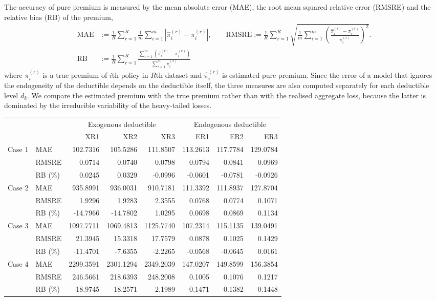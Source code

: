 \documentclass[11pt]{article}
\begin{document}
{The accuracy of pure premium is measured by the mean absolute error (MAE), the root mean squared relative error (RMSRE) and the relative bias (RB) of the premium,
\begin{align*}
\text{MAE}&:=\frac{1}{R}\sum_{r=1}^{R}\frac{1}{m}\sum_{i=1}^{m}\left|\hat\pi^{(r)}_i-\pi^{(r)}_i\right|,\qquad
\text{RMSRE}:=\frac{1}{R}\sum_{r=1}^{R}\sqrt{\frac{1}{m}\sum_{i=1}^{m}\left(\frac{\hat\pi^{(r)}_i-\pi^{(r)}_i}{\pi^{(r)}_i}\right)^2}.\\
\text{RB}&:=\frac{1}{R}\sum_{r=1}^{R}\frac{\sum_{i=1}^{m}(\hat\pi^{(r)}_i-\pi^{(r)}_i)}{\sum_{i=1}^{m}\pi_i^{(r)}}
\end{align*}
where $\pi^{(r)}_i$ is a true premium of $i$th policy in $R$th dataset and $\hat{\pi}^{(r)}_i$ is estimated pure premium. Since the error of a model that ignores the endogeneity of the deductible depends on the deductible itself, the three measures are also computed separately for each deductible level $d_k$. We compare the estimated premium with the true premium rather than with the realised aggregate loss, because the latter is dominated by the irreducible variability of the heavy-tailed losses.

\begin{table}[h!]
\footnotesize
\centering
{
\begin{tabular}{llrrrrrr}
\toprule
& & \multicolumn{3}{c}{Exogenous deductible} & \multicolumn{3}{c}{Endogenous deductible} \\
\cmidrule(lr){3-5} \cmidrule(lr){6-8}
 & & XR1 & XR2 & XR3 & ER1 & ER2 & ER3 \\
\midrule
\multirow{3}{*}{Case 1} & MAE & 102.7316 & 105.5286 & 111.8507 & 113.2613 & 117.7784 & 129.0784  \\
 & RMSRE & 0.0714 & 0.0740 & 0.0798 & 0.0794 & 0.0841 & 0.0969 \\
 & RB (\%) & 0.0245 & 0.0329 & -0.0996 & -0.0601 & -0.0781 & -0.0926 \\
\midrule
\multirow{3}{*}{Case 2} & MAE & 935.8991 & 936.0031 & 910.7181 & 111.3392 & 111.8937 & 127.8704 \\
 & RMSRE  & 1.9296 & 1.9283 & 2.3555 & 0.0768 & 0.0774 & 0.1071 \\
 & RB (\%) & -14.7966 & -14.7802 & 1.0295 & 0.0698 & 0.0869 & 0.1134\\
\midrule
\multirow{3}{*}{Case 3} & MAE & 1097.7711 & 1069.4813 & 1125.7740 & 107.2314 & 115.1135 & 139.0491 \\
 & RMSRE & 21.3945 & 15.3318 & 17.7579 & 0.0878 & 0.1025 & 0.1429\\
 & RB (\%) & -11.4701 & -7.6355 & -2.2265 & -0.0568 & -0.0645 & 0.0161 \\
\midrule
\multirow{3}{*}{Case 4} & MAE & 2299.3591 & 2301.1294 & 2349.2039 & 147.0207 & 149.8599 & 156.3854 \\
 & RMSRE & 246.5661 & 218.6393 & 248.2008 & 0.1005 & 0.1076 & 0.1217 \\
 & RB (\%) & -18.9745 & -18.2571 & -2.1989 & -0.1471 & -0.1382 & -0.1448 \\
\bottomrule
\end{tabular}
}


\end{table}}
\end{document}
